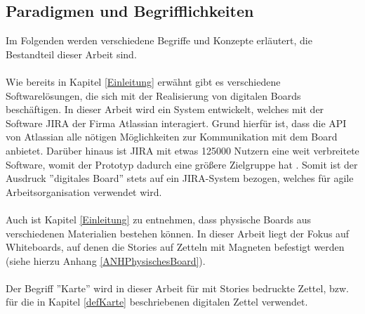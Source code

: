 \documentclass[12pt,titlepage]{scrartcl}
\begin{document}
		\subsection{Paradigmen und Begrifflichkeiten}
		Im Folgenden werden verschiedene Begriffe und Konzepte erläutert, die Bestandteil dieser Arbeit sind. \\ \\
		Wie bereits in Kapitel \ref{Einleitung} erwähnt gibt es verschiedene Softwarelösungen, die sich mit der Realisierung von digitalen Boards beschäftigen. In dieser Arbeit wird ein System entwickelt, welches mit der Software JIRA der Firma Atlassian interagiert. Grund hierfür ist, dass die API von Atlassian alle nötigen Möglichkeiten zur Kommunikation mit dem Board anbietet. Darüber hinaus ist JIRA mit etwas 125000 Nutzern eine weit verbreitete Software, womit der Prototyp dadurch eine größere Zielgruppe hat \cite{jirarevenue}. Somit ist der Ausdruck ''digitales Board'' stets auf ein JIRA-System bezogen, welches für agile Arbeitsorganisation verwendet wird. \\ \\
		Auch ist Kapitel \ref{Einleitung} zu entnehmen, dass physische Boards aus verschiedenen Materialien bestehen können. In dieser Arbeit liegt der Fokus auf Whiteboards, auf denen die Stories auf Zetteln mit Magneten befestigt werden (siehe hierzu Anhang \ref{ANHPhysischesBoard}). \\ \\
		Der Begriff ''Karte'' wird in dieser Arbeit für mit Stories bedruckte Zettel, bzw. für die in Kapitel \ref{defKarte} beschriebenen digitalen Zettel verwendet. 
\end{document}
